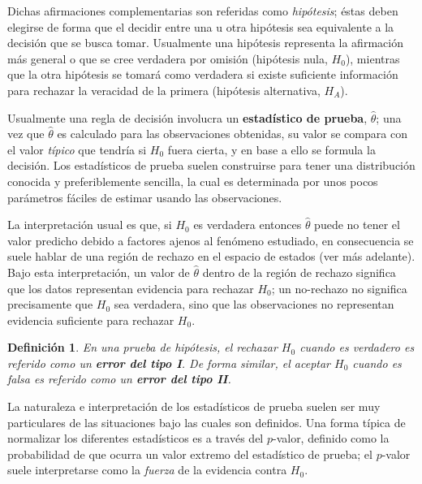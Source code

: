 \documentclass[12pt,letterpaper]{book}
\newtheorem{definicion}{Definición}[chapter]
\newcommand{\est}[1]{\widehat{ #1 }}
\begin{document}
Dichas afirmaciones complementarias son referidas como \textit{hipótesis}; éstas deben elegirse de forma que el decidir entre una u otra hipótesis sea equivalente a la decisión que se busca tomar. 
%
Usualmente una hipótesis representa la afirmación más general o que se cree verdadera por omisión (hipótesis nula, $H_0$), mientras que la otra hipótesis se tomará como verdadera si existe suficiente información para rechazar la veracidad de la primera (hipótesis alternativa, $H_A$).

Usualmente una regla de decisión involucra un \textbf{estadístico de prueba}, $\widehat{\theta}$; una vez que $\widehat{\theta}$ es calculado para las observaciones obtenidas, su valor se compara con el valor \textit{típico} que tendría si $H_0$ fuera cierta, y en base a ello se formula la decisión.
%
Los estadísticos de prueba suelen construirse para tener una distribución conocida y preferiblemente sencilla, la cual es determinada por unos pocos parámetros fáciles de estimar usando las observaciones.

La interpretación usual es que, si $H_0$ es verdadera entonces $\est{\theta}$ puede no tener el valor predicho debido a factores ajenos al fenómeno estudiado, en consecuencia se suele hablar de una región de rechazo en el espacio de estados (ver más adelante).
%
Bajo esta interpretación, un valor de $\widehat{\theta}$ dentro de la región de rechazo significa que los datos representan evidencia para rechazar $H_0$; un no-rechazo no significa precisamente que $H_0$ sea verdadera, sino que las observaciones no representan evidencia suficiente para rechazar $H_0$.

\begin{definicion}
En una prueba de hipótesis, el rechazar $H_0$ cuando es verdadero es referido como un \textbf{error del tipo I}. De forma similar, el aceptar $H_0$ cuando es falsa es referido como un \textbf{error del tipo II}.
\end{definicion}

La naturaleza e interpretación de los estadísticos de prueba suelen ser muy particulares de las situaciones bajo las cuales son definidos.
%
Una forma típica de normalizar los diferentes estadísticos es a través del $p$-valor, definido como la probabilidad de que ocurra un valor extremo del estadístico de prueba; 
el $p$-valor suele interpretarse como la \textit{fuerza} de la evidencia contra $H_0$.
\end{document}

